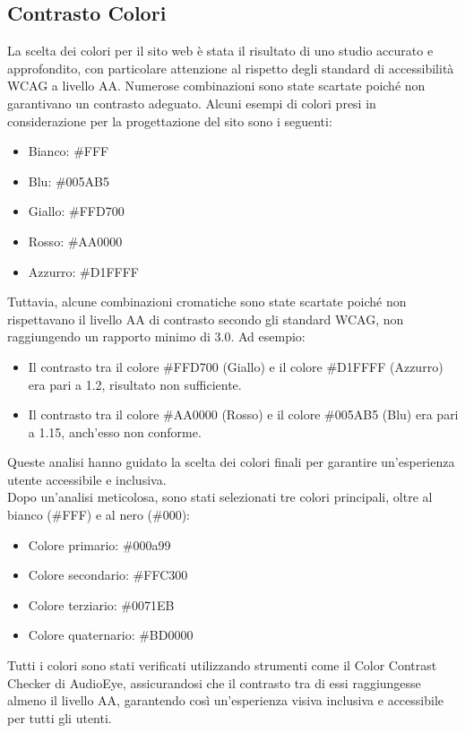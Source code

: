 \subsection{Contrasto Colori}
La scelta dei colori per il sito web è stata il risultato di uno studio accurato e approfondito, con particolare attenzione al rispetto degli standard di accessibilità WCAG a livello AA. Numerose combinazioni sono state scartate poiché non garantivano un contrasto adeguato. 
Alcuni esempi di colori presi in considerazione per la progettazione del sito sono i seguenti:  
\begin{itemize}
    \item Bianco: \#FFF
    \item Blu: \#005AB5
    \item Giallo: \#FFD700
    \item Rosso: \#AA0000
    \item Azzurro: \#D1FFFF
\end{itemize}
Tuttavia, alcune combinazioni cromatiche sono state scartate poiché non rispettavano il livello AA di contrasto secondo gli standard WCAG, non raggiungendo un rapporto minimo di 3.0.  
Ad esempio: 
\begin{itemize}
    \item Il contrasto tra il colore \#FFD700 (Giallo) e il colore \#D1FFFF (Azzurro) era pari a 1.2, risultato non sufficiente.
    \item Il contrasto tra il colore \#AA0000 (Rosso) e il colore \#005AB5 (Blu) era pari a 1.15, anch'esso non conforme.
\end{itemize}
Queste analisi hanno guidato la scelta dei colori finali per garantire un'esperienza utente accessibile e inclusiva.
\\
Dopo un'analisi meticolosa, sono stati selezionati tre colori principali, oltre al bianco (\#FFF) e al nero (\#000):
\begin{itemize}
    \item Colore primario: \#000a99
    \item Colore secondario: \#FFC300
    \item Colore terziario: \#0071EB
    \item Colore quaternario: \#BD0000
\end{itemize}
Tutti i colori sono stati verificati utilizzando strumenti come il Color Contrast Checker di AudioEye, assicurandosi che il contrasto tra di essi raggiungesse almeno il livello AA, garantendo così un’esperienza visiva inclusiva e accessibile per tutti gli utenti.
